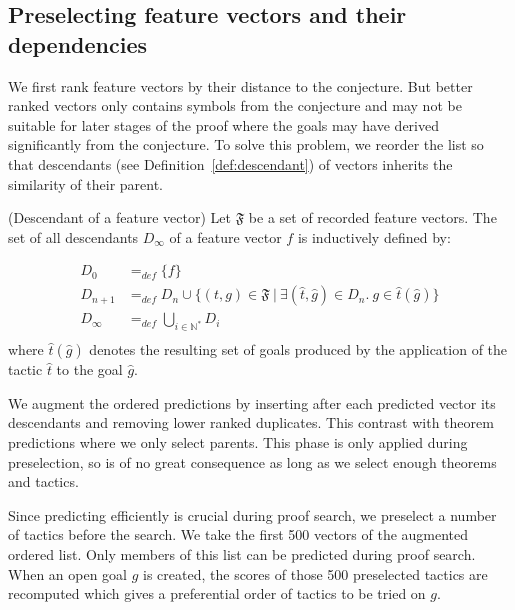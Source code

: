 \documentclass[runningheads,a4paper,draft]{svjour3}
\begin{document}
\subsection{Preselecting feature vectors and their  
dependencies}\label{sec:dependencies}
We first rank feature vectors by their distance to the conjecture. But better 
ranked vectors only contains symbols from 
the conjecture and may not be suitable for later stages of the proof where the 
goals may have derived significantly from the conjecture. To solve this 
problem, we reorder the list so that descendants (see 
Definition~\ref{def:descendant}) of vectors inherits the similarity of their 
parent.

\begin{definition}(Descendant of a feature vector)\label{def:descendant}
Let $\mathfrak{F}$ be a set of recorded feature vectors. 
The set of all descendants $D_\infty$ of a feature vector $f$ is 
inductively defined by:

\begin{align*}
D_0 &=_{def} \lbrace f \rbrace \\
D_{n+1} &=_{def} D_n \cup \lbrace (t,g)\in \mathfrak{F}\  |\ \exists 
(\hat{t},\hat{g}) \in D_n.\ g \in \hat{t}(\hat{g}) \rbrace  \\
D_\infty &=_{def} \bigcup_{i \in \mathbb{N}^*} D_i\\
\end{align*}
where $\hat{t}(\hat{g})$ denotes the resulting set of goals produced by the 
application 
of the tactic $\hat{t}$ to the goal $\hat{g}$.
\end{definition}

We augment the ordered predictions by inserting after each predicted vector 
its descendants and removing lower ranked duplicates. This contrast with 
theorem predictions where we only select parents. This phase is only applied 
during preselection, so is of no great consequence as long as we select enough 
theorems and tactics.

Since predicting efficiently is crucial during proof 
search, we preselect a number of tactics before the search.
We take the first 500 vectors of the augmented ordered list. Only members of 
this list can be predicted during proof search. When an 
open goal $g$ is created, the scores of those 500 preselected tactics are
recomputed which gives a preferential order of tactics to be tried on $g$.


\end{document}
